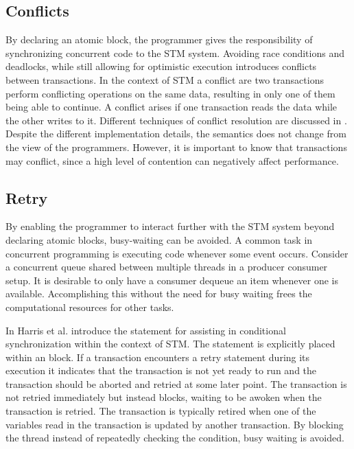 \subsection{Conflicts}
By declaring an atomic block, the programmer gives the responsibility of synchronizing concurrent code to the \ac{STM} system. Avoiding race conditions and deadlocks, while still allowing for optimistic execution introduces conflicts between transactions. In the context of \ac{STM} a conflict are two transactions perform conflicting operations on the same data, resulting in only one of them being able to continue\cite[p. 20]{harris2010transactional}. A conflict arises if one transaction reads the data while the other writes to it. Different techniques of conflict resolution are discussed in \cite[p. 45-46 \& 52-55]{dpt907e14trending}. Despite the different implementation details, the semantics does not change from the view of the programmers. However, it is important to know that transactions may conflict, since a high level of contention can negatively affect performance\cite[p. 52]{dpt907e14trending}.

\subsection{Retry}
By enabling the programmer to interact further with the \ac{STM} system beyond declaring atomic blocks, busy-waiting can be avoided. A common task in concurrent programming is executing code whenever some event occurs. Consider a concurrent queue shared between multiple threads in a producer consumer setup. It is desirable to only have a consumer dequeue an item whenever one is available. Accomplishing this without the need for busy waiting frees the computational resources for other tasks.

In \cite{harris2005composable} Harris et al. introduce the  statement for assisting in conditional synchronization within the context of \ac{STM}. The  statement is explicitly placed within an  block. If a transaction encounters a retry statement during its execution it indicates that the transaction is not yet ready to run and the transaction should be aborted and retried at some later point\cite[p. 73]{harris2010transactional}. The transaction is not retried immediately but instead blocks, waiting to be awoken when the transaction is retried. The transaction is typically retired when one of the variables read in the transaction is updated by another transaction\cite[p. 51]{harris2005composable}. By blocking the thread instead of repeatedly checking the condition, busy waiting is avoided.


